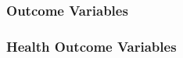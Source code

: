 \documentclass[
  single column]{article}
\begin{document}
\begin{longtable}[t]{llllll}
\end{longtable}

\endgroup{}
\endgroup{}

\newpage{}

\subsubsection{Outcome Variables}\label{appendix-outcomes}

\subsubsection{Health Outcome Variables}\label{health-outcome-variables}

\begingroup\fontsize{12}{14}\selectfont
\begingroup\fontsize{8}{10}\selectfont
\end{document}
